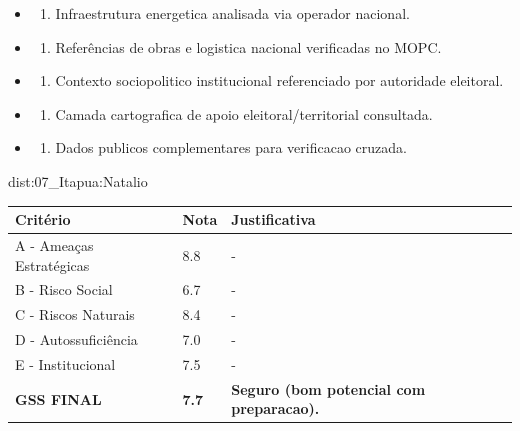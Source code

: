 {\begin{itemize}
\item
  \begin{enumerate}
  \def\labelenumi{\arabic{enumi})}
  \setcounter{enumi}{7}
  \tightlist
  \item
    Infraestrutura energetica analisada via operador nacional.
  \end{enumerate}
\item
  \begin{enumerate}
  \def\labelenumi{\arabic{enumi})}
  \setcounter{enumi}{8}
  \tightlist
  \item
    Referências de obras e logistica nacional verificadas no MOPC.
  \end{enumerate}
\item
  \begin{enumerate}
  \def\labelenumi{\arabic{enumi})}
  \setcounter{enumi}{9}
  \tightlist
  \item
    Contexto sociopolitico institucional referenciado por autoridade
    eleitoral.
  \end{enumerate}
\item
  \begin{enumerate}
  \def\labelenumi{\arabic{enumi})}
  \setcounter{enumi}{10}
  \tightlist
  \item
    Camada cartografica de apoio eleitoral/\allowbreak territorial consultada.
  \end{enumerate}
\item
  \begin{enumerate}
  \def\labelenumi{\arabic{enumi})}
  \setcounter{enumi}{11}
  \tightlist
  \item
    Dados publicos complementares para verificacao cruzada.
  \end{enumerate}
\end{itemize}}{dist:07_Itapua:Natalio}
\begin{table}[ht!]
\small \begin{tabular}{p{3.0cm}p{0.8cm}p{6.0cm}} \toprule
\textbf{Critério} & \textbf{Nota} & \textbf{Justificativa} \\ \midrule
A - Ameaças Estratégicas & 8.8 & - \\
B - Risco Social & 6.7 & - \\
C - Riscos Naturais & 8.4 & - \\
D - Autossuficiência & 7.0 & - \\
E - Institucional & 7.5 & - \\
\midrule \textbf{GSS FINAL} & \textbf{7.7} & \textbf{Seguro (bom potencial com preparacao).} \\ \bottomrule \end{tabular}
\end{table}
